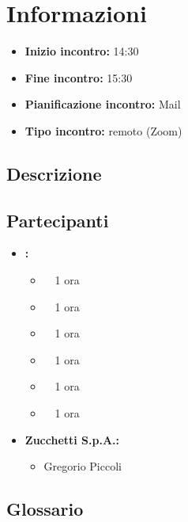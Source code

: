 \section{Informazioni}
\begin{itemize}
	\item \textbf{Inizio incontro:} 14:30
	\item \textbf{Fine incontro:} 15:30
	\item \textbf{Pianificazione incontro:} Mail
	\item \textbf{Tipo incontro:} remoto (Zoom)
\end{itemize}

\subsection{Descrizione}
\DocDescription

\subsection{Partecipanti}

\begin{itemize}
	\item \textbf{\GroupName:}
	\begin{itemize}
		\item \tommaso \ \rightarrow\ 1 ora
		\item \marco \ \rightarrow\ 1 ora
		\item \riccardo \ \rightarrow\ 1 ora
		\item \raul \ \rightarrow\ 1 ora 
		\item \martina \ \rightarrow\ 1 ora 
		\item \sebastiano \ \rightarrow\ 1 ora
	\end{itemize}
	\item \textbf{Zucchetti S.p.A.:}
    \begin{itemize}
        \item Gregorio Piccoli
    \end{itemize}
\end{itemize}

\subsection{Glossario}
\GlossarioIntroduzioneVE

\clearpage